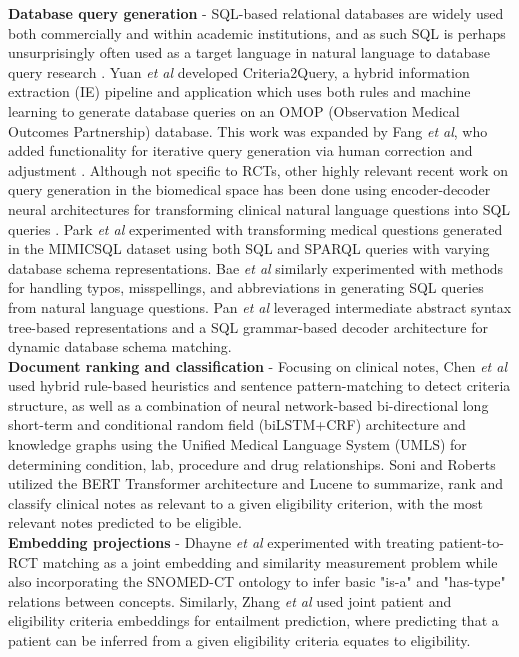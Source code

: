 \documentclass[../main.tex]{subfiles}
\begin{document}
\noindent \textbf{Database query generation} - SQL-based relational databases are widely used both commercially and within academic institutions, and as such SQL is perhaps unsurprisingly often used as a target language in natural language to database query research \cite{dar2019frameworks}. Yuan \textit{et al} developed Criteria2Query, a hybrid information extraction (IE) pipeline and application which uses both rules and machine learning to generate database queries on an OMOP \cite{hripcsak2015observational} (Observation Medical Outcomes Partnership) database. This work was expanded by Fang \textit{et al}, who added functionality for iterative query generation via human correction and adjustment \cite{fang2022combining}. Although not specific to RCTs, other highly relevant recent work on query generation in the biomedical space has been done using encoder-decoder neural architectures for transforming clinical natural language questions into SQL queries \cite{bae2021question, park2021knowledge, wang2020text, pan2021bert, dhayne2021emr2vec}. Park \textit{et al} \cite{park2021knowledge} experimented with transforming medical questions generated in the MIMICSQL dataset \cite{wang2020text} using both SQL and SPARQL queries with varying database schema representations. Bae \textit{et al} similarly experimented with methods for handling typos, misspellings, and abbreviations in generating SQL queries from natural language questions. Pan \textit{et al} \cite{pan2021bert} leveraged intermediate abstract syntax tree-based representations and a SQL grammar-based decoder architecture for dynamic database schema matching. \\

\noindent \textbf{Document ranking and classification} - Focusing on clinical notes, Chen \textit{et al} \cite{chen2019clinical} used hybrid rule-based heuristics and sentence pattern-matching to detect criteria structure, as well as a combination of neural network-based bi-directional long short-term and conditional random field (biLSTM+CRF) architecture and knowledge graphs using the Unified Medical Language System (UMLS) for determining condition, lab, procedure and drug relationships. Soni and Roberts \cite{soni2020patient} utilized the BERT Transformer architecture \cite{devlin2018bert} and Lucene \cite{lucene} to summarize, rank and classify clinical notes as relevant to a given eligibility criterion, with the most relevant notes predicted to be eligible. \\

\noindent \textbf{Embedding projections} - Dhayne \textit{et al} \cite{dhayne2021emr2vec} experimented with treating patient-to-RCT matching as a joint embedding and similarity measurement problem while also incorporating the SNOMED-CT ontology to infer basic "is-a" and "has-type" relations between concepts. Similarly, Zhang \textit{et al} used joint patient and eligibility criteria embeddings for entailment prediction, where predicting that a patient can be inferred from a given eligibility criteria equates to eligibility. \\
\end{document}
